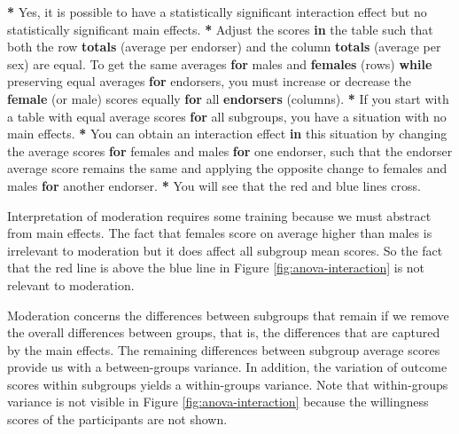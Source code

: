 \documentclass[a4paper]{book}
\newenvironment{Shaded}{\begin{snugshade}}{\end{snugshade}}
\newcommand{\KeywordTok}[1]{\textcolor[rgb]{0,0,0}{\textbf{#1}}}
\newcommand{\StringTok}[1]{\textcolor[rgb]{0.00,0.00,0.00}{#1}}
\newcommand{\ControlFlowTok}[1]{\textcolor[rgb]{0.00,0.00,0.00}{\textbf{#1}}}
\newcommand{\OperatorTok}[1]{\textcolor[rgb]{0.00,0.00,0.00}{\textbf{#1}}}
\newcommand{\NormalTok}[1]{#1}
\theoremstyle{definition}
\theoremstyle{definition}
\theoremstyle{definition}
\theoremstyle{remark}
\begin{document}
\begin{Shaded}
\begin{Highlighting}[]
\OperatorTok{*}\StringTok{ }\NormalTok{Yes, it is possible to have a statistically significant interaction effect}
\NormalTok{but no statistically significant main effects.}
\OperatorTok{*}\StringTok{ }\NormalTok{Adjust the scores }\ControlFlowTok{in}\NormalTok{ the table such that both the row }\KeywordTok{totals}\NormalTok{ (average per}
\NormalTok{endorser) and the column }\KeywordTok{totals}\NormalTok{ (average per sex) are equal. To get the same}
\NormalTok{averages }\ControlFlowTok{for}\NormalTok{ males and }\KeywordTok{females}\NormalTok{ (rows) }\ControlFlowTok{while}\NormalTok{ preserving equal averages }\ControlFlowTok{for}
\NormalTok{endorsers, you must increase or decrease the }\KeywordTok{female}\NormalTok{ (or male) scores equally}
\ControlFlowTok{for}\NormalTok{ all }\KeywordTok{endorsers}\NormalTok{ (columns).}
\OperatorTok{*}\StringTok{ }\NormalTok{If you start with a table with equal average scores }\ControlFlowTok{for}\NormalTok{ all subgroups, you}
\NormalTok{have a situation with no main effects.}
\OperatorTok{*}\StringTok{ }\NormalTok{You can obtain an interaction effect }\ControlFlowTok{in}\NormalTok{ this situation by changing the}
\NormalTok{average scores }\ControlFlowTok{for}\NormalTok{ females and males }\ControlFlowTok{for}\NormalTok{ one endorser, such that the endorser}
\NormalTok{average score remains the same and applying the opposite change to females and}
\NormalTok{males }\ControlFlowTok{for}\NormalTok{ another endorser.}
\OperatorTok{*}\StringTok{ }\NormalTok{You will see that the red and blue lines cross.}
\end{Highlighting}
\end{Shaded}

Interpretation of moderation requires some training because we must
abstract from main effects. The fact that females score on average
higher than males is irrelevant to moderation but it does affect all
subgroup mean scores. So the fact that the red line is above the blue
line in Figure \ref{fig:anova-interaction} is not relevant to
moderation.

Moderation concerns the differences between subgroups that remain if we
remove the overall differences between groups, that is, the differences
that are captured by the main effects. The remaining differences between
subgroup average scores provide us with a between-groups variance. In
addition, the variation of outcome scores within subgroups yields a
within-groups variance. Note that within-groups variance is not visible
in Figure \ref{fig:anova-interaction} because the willingness scores of
the participants are not shown.
\end{document}
